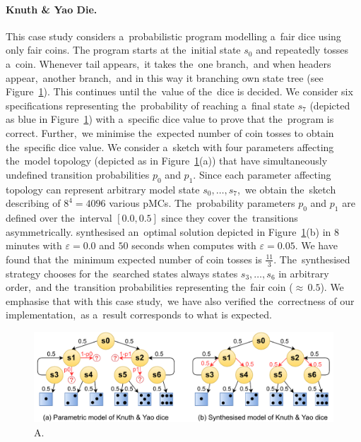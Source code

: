 \paragraph{Knuth \& Yao Die.}
This case study considers a~probabilistic program modelling a~fair dice using only fair coins.
The program starts at the~initial state $s_0$ and repeatedly tosses a~coin.
Whenever tail appears,~it takes the~one branch,~and when headers appear,~another branch,~and in this way it branching own state tree (see Figure~\ref{fig:kydie}).
This continues until the~value of the~dice is decided.
We consider six specifications representing the~probability of reaching a~final state $s_7$ (depicted as blue in Figure~\ref{fig:kydie}) with a~specific dice value to prove that the~program is correct.
Further,~we minimise the~expected number of coin tosses to obtain the~specific dice value.
We consider a~sketch with four parameters affecting the~model topology (depicted as  in Figure~\ref{fig:kydie}(a)) that have simultaneously undefined transition probabilities $p_0$ and $p_1$.
Since each parameter affecting topology can represent arbitrary model state $s_0, \dots, s_7$,~we obtain the~sketch describing of $8^4 = 4096$ various pMCs.
The~probability parameters $p_0$ and $p_1$ are defined over the~interval $[0.0, 0.5]$ since they cover the~transitions asymmetrically.
\toolname{} synthesised an~optimal solution depicted in Figure~\ref{fig:kydie}(b) in $8$ minutes with $\varepsilon = 0.0$ and $50$ seconds when computes with $\varepsilon = 0.05$. 
We have found that the~minimum expected number of coin tosses is $\frac{11}{3}$.
The~synthesised strategy chooses for the~searched states always states $s_3, \dots, s_6$ in arbitrary order,~and the~transition probabilities representing the~fair coin (${\approx} \, 0.5$).
We emphasise that with this case study,~we have also verified the~correctness of our implementation,~as a~result corresponds to what is expected.

\begin{figure}[h!]
\centering
\includegraphics[width=1.0\textwidth]{figures/kydie.pdf}
\caption{A.}%
\label{fig:kydie}%
\end{figure}

